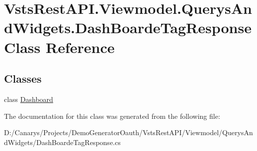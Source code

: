 \hypertarget{class_vsts_rest_a_p_i_1_1_viewmodel_1_1_querys_and_widgets_1_1_dash_boarde_tag_response}{}\section{Vsts\+Rest\+A\+P\+I.\+Viewmodel.\+Querys\+And\+Widgets.\+Dash\+Boarde\+Tag\+Response Class Reference}
\label{class_vsts_rest_a_p_i_1_1_viewmodel_1_1_querys_and_widgets_1_1_dash_boarde_tag_response}
\subsection*{Classes}
\begin{DoxyCompactItemize}
\item 
class \mbox{\hyperlink{class_vsts_rest_a_p_i_1_1_viewmodel_1_1_querys_and_widgets_1_1_dash_boarde_tag_response_1_1_dashboard}{Dashboard}}
\end{DoxyCompactItemize}


The documentation for this class was generated from the following file\+:\begin{DoxyCompactItemize}
\item 
D\+:/\+Canarys/\+Projects/\+Demo\+Generator\+Oauth/\+Vsts\+Rest\+A\+P\+I/\+Viewmodel/\+Querys\+And\+Widgets/Dash\+Boarde\+Tag\+Response.\+cs\end{DoxyCompactItemize}

